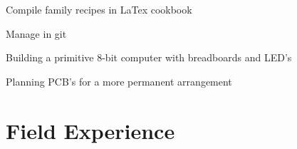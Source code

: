 \documentclass[letterpaper]{resume}
\begin{document}
\begin{compactitem}
\item Compile family recipes in LaTex cookbook
\item Manage in git
\end{compactitem}

\begin{compactitem}
\item Building a primitive 8-bit computer with breadboards and LED's
\item Planning PCB's for a more permanent arrangement
\end{compactitem}

\section{Field Experience}
\end{document}
